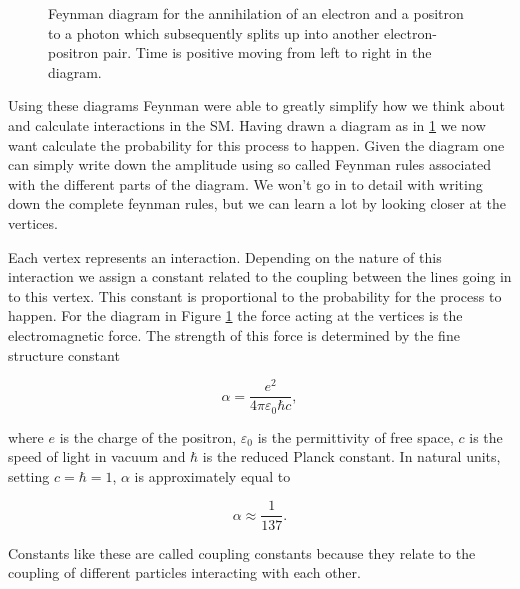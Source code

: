 \begin{figure}[htp]
\centering
	
\caption{Feynman diagram for the annihilation of an electron and a positron to a photon which subsequently splits up into another electron-positron pair. Time is positive moving from left to right in the diagram.} \label{fig:feynmandiagram}
\end{figure}

% 	

Using these diagrams Feynman were able to greatly simplify how we think about and calculate interactions in the SM. Having drawn a diagram as in \ref{fig:feynmandiagram} we now want calculate the probability for this process to happen. Given the diagram one can simply write down the amplitude using so called Feynman rules associated with the different parts of the diagram. We won't go in to detail with writing down the complete feynman rules, but we can learn a lot by looking closer at the vertices.

Each vertex represents an interaction. Depending on the nature of this interaction we assign a constant related to the coupling between the lines going in to this vertex. This constant is proportional to the probability for the process to happen. For the diagram in Figure \ref{fig:feynmandiagram} the force acting at the vertices is the electromagnetic force. The strength of this force is determined by the fine structure constant

\begin{equation}
	\alpha = \frac{e^2}{4\pi\varepsilon_0\hbar c},
\end{equation}

where $e$ is the charge of the positron, $\varepsilon_0$ is the permittivity of free space, $c$ is the speed of light in vacuum and $\hbar$ is the reduced Planck constant. In natural units, setting $c = \hbar = 1$, $\alpha$ is approximately equal to

\begin{equation}
	 \alpha \approx \frac{1}{137}.
\end{equation}

Constants like these are called coupling constants because they relate to the coupling of different particles interacting with each other.
